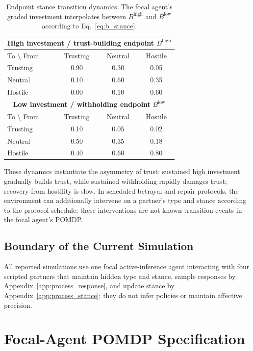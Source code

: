 \documentclass[runningheads,orivec]{llncs}
\begin{document}
\begin{table}[H]
\centering
\caption{Endpoint stance transition dynamics. The focal agent's graded investment interpolates between $B^{\mathrm{high}}$ and $B^{\mathrm{low}}$ according to Eq.~\eqref{eq:b_stance}.}
\label{tab:stance_transition}
\setlength{\tabcolsep}{4pt}
\begin{tabular}{lccc}
\toprule
\multicolumn{4}{c}{\textbf{High investment / trust-building endpoint }$B^{\mathrm{high}}$} \\
\midrule
To $\setminus$ From & Trusting & Neutral & Hostile \\
\midrule
Trusting & 0.90 & 0.30 & 0.05 \\
Neutral & 0.10 & 0.60 & 0.35 \\
Hostile & 0.00 & 0.10 & 0.60 \\
\midrule
\multicolumn{4}{c}{\textbf{Low investment / withholding endpoint }$B^{\mathrm{low}}$} \\
\midrule
To $\setminus$ From & Trusting & Neutral & Hostile \\
\midrule
Trusting & 0.10 & 0.05 & 0.02 \\
Neutral & 0.50 & 0.35 & 0.18 \\
Hostile & 0.40 & 0.60 & 0.80 \\
\bottomrule
\end{tabular}
\end{table}

These dynamics instantiate the asymmetry of trust: sustained high investment gradually builds trust, while sustained withholding rapidly damages trust; recovery from hostility is slow. In scheduled betrayal and repair protocols, the environment can additionally intervene on a partner's type and stance according to the protocol schedule; these interventions are not known transition events in the focal agent's POMDP.

\subsection{Boundary of the Current Simulation}

All reported simulations use one focal active-inference agent interacting with four scripted partners that maintain hidden type and stance, sample responses by Appendix~\ref{app:process_response}, and update stance by Appendix~\ref{app:process_stance}; they do not infer policies or maintain affective precision.
\section{Focal-Agent POMDP Specification}
\label{app:pomdp}
\end{document}
